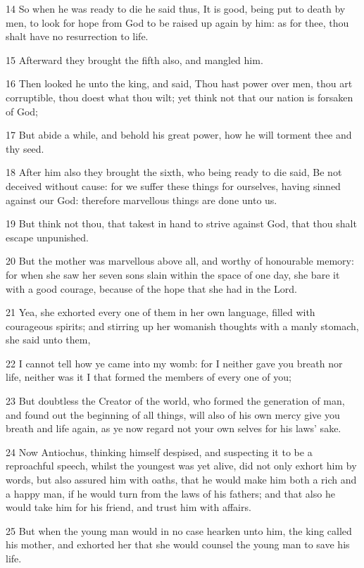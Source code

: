 \par 14 So when he was ready to die he said thus, It is good, being put to death by men, to look for hope from God to be raised up again by him: as for thee, thou shalt have no resurrection to life.
\par 15 Afterward they brought the fifth also, and mangled him.
\par 16 Then looked he unto the king, and said, Thou hast power over men, thou art corruptible, thou doest what thou wilt; yet think not that our nation is forsaken of God;
\par 17 But abide a while, and behold his great power, how he will torment thee and thy seed.
\par 18 After him also they brought the sixth, who being ready to die said, Be not deceived without cause: for we suffer these things for ourselves, having sinned against our God: therefore marvellous things are done unto us.
\par 19 But think not thou, that takest in hand to strive against God, that thou shalt escape unpunished.
\par 20 But the mother was marvellous above all, and worthy of honourable memory: for when she saw her seven sons slain within the space of one day, she bare it with a good courage, because of the hope that she had in the Lord.
\par 21 Yea, she exhorted every one of them in her own language, filled with courageous spirits; and stirring up her womanish thoughts with a manly stomach, she said unto them,
\par 22 I cannot tell how ye came into my womb: for I neither gave you breath nor life, neither was it I that formed the members of every one of you;
\par 23 But doubtless the Creator of the world, who formed the generation of man, and found out the beginning of all things, will also of his own mercy give you breath and life again, as ye now regard not your own selves for his laws' sake.
\par 24 Now Antiochus, thinking himself despised, and suspecting it to be a reproachful speech, whilst the youngest was yet alive, did not only exhort him by words, but also assured him with oaths, that he would make him both a rich and a happy man, if he would turn from the laws of his fathers; and that also he would take him for his friend, and trust him with affairs.
\par 25 But when the young man would in no case hearken unto him, the king called his mother, and exhorted her that she would counsel the young man to save his life.
